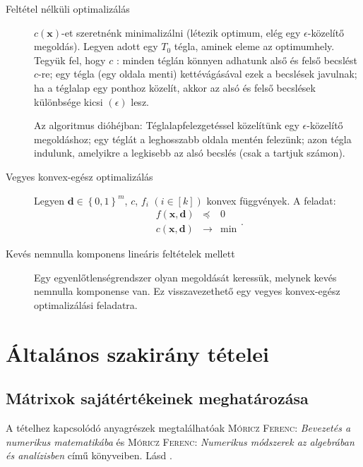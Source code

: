 \documentclass[%
	DIV=15,appendixprefix]{scrreprt}
\theoremstyle{definition}
\theoremstyle{remark}
\begin{document}
%
\begin{description}
	\item[Feltétel nélküli optimalizálás] $ c \left( \mathbf{ x } \right) $-et szeretnénk
		minimalizálni (létezik optimum, elég egy $ \epsilon $-kö\-ze\-lí\-tő megoldás). Legyen adott egy
		$ T_{ 0 } $ tégla, aminek eleme az optimumhely. Tegyük fel, hogy $ c $ : minden
		téglán könnyen adhatunk alső és felső becslést $ c $-re; egy tégla (egy oldala menti)
		kettévágásával ezek a becslések javulnak; ha a téglalap egy ponthoz közelít, akkor az alsó
		és felső becslések különbsége kicsi $ \left( \epsilon \right) $ lesz.

		Az algoritmus dióhéjban: Téglalapfelezgetéssel közelítünk egy $ \epsilon $-közelítő
		megoldáshoz; egy téglát a leghosszabb oldala mentén felezünk; azon tégla 
		indulunk, amelyikre a legkisebb az alsó becslés (csak a  tartjuk számon).
	\item[Vegyes konvex-egész optimalizálás] Legyen $ \mathbf{ d } \in \left\{ 0,{} 1
		\right\}^{ m } $, $ c $, $ f_{ i } $ $ \left( i \in \left[ k \right] \right) $ konvex függvények. A feladat:
		\begin{equation*}
			\begin{array}{rcl}
				f \left( \mathbf{ x },{} \mathbf{ d } \right) 	&	\preceq			& 0\\
				\hline
				c \left( \mathbf{ x },{} \mathbf{ d } \right) 	&	\rightarrow	&	\min
			\end{array}.
		\end{equation*}
	\item[Kevés nemnulla komponens lineáris feltételek mellett] Egy egyenlőtlenségrendszer olyan
	megoldását keressük, melynek kevés nemnulla komponense van. Ez visszavezethető egy vegyes
	konvex-egész optimalizálási feladatra.
\end{description}
%
%
%
\chapter{Általános szakirány tételei}
%
\section{Mátrixok sajátértékeinek meghatározása}
%
A tételhez kapcsolódó anyagrészek megtalálhatóak \textsc{Móricz Ferenc}: \emph{Bevezetés a numerikus
matematikába} \cite{Moricz2008} és \textsc{Móricz Ferenc}: \emph{Numerikus módszerek az algebrában
és analízisben} \cite{Moricz1997} című könyveiben.
%
Lásd \cite[I. fejezet, 1. szakasz]{Moricz1997}.
\end{document}
